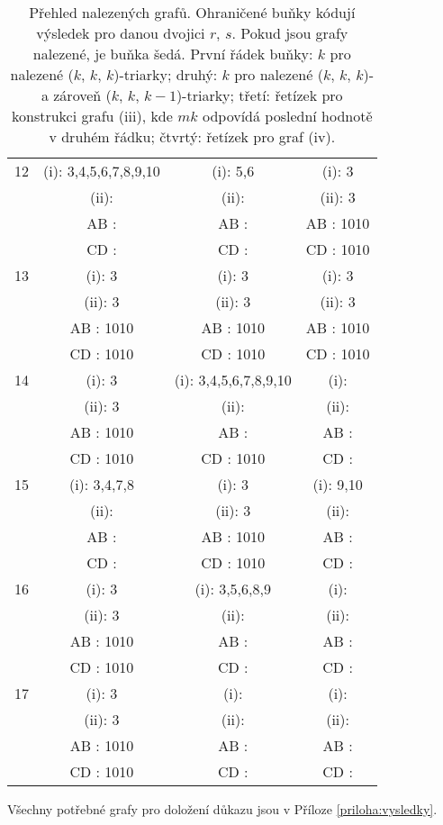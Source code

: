 \begin{table}[h]
{\begin{tabular}{| c || c | c | c |}
12 & (i): 3,4,5,6,7,8,9,10 & (i): 5,6 & \cellcolor{lightgray}(i): 3\\
 & (ii):  & (ii):  & \cellcolor{lightgray}(ii): 3\\
 & AB :  & AB :  & \cellcolor{lightgray}AB : 1010\\
 & CD :  & CD :  & \cellcolor{lightgray}CD : 1010\\\hline

13 & \cellcolor{lightgray}(i): 3 & \cellcolor{lightgray}(i): 3 & \cellcolor{lightgray}(i): 3\\
 & \cellcolor{lightgray}(ii): 3 & \cellcolor{lightgray}(ii): 3 & \cellcolor{lightgray}(ii): 3\\
 & \cellcolor{lightgray}AB : 1010 & \cellcolor{lightgray}AB : 1010 & \cellcolor{lightgray}AB : 1010\\
 & \cellcolor{lightgray}CD : 1010 & \cellcolor{lightgray}CD : 1010 & \cellcolor{lightgray}CD : 1010\\\hline

14 & \cellcolor{lightgray}(i): 3 & (i): 3,4,5,6,7,8,9,10 & (i): \\
 & \cellcolor{lightgray}(ii): 3 & (ii):  & (ii): \\
 & \cellcolor{lightgray}AB : 1010 & AB :  & AB : \\
 & \cellcolor{lightgray}CD : 1010 & CD : 1010 & CD : \\\hline

15 & (i): 3,4,7,8 & \cellcolor{lightgray}(i): 3 & (i): 9,10\\
 & (ii):  & \cellcolor{lightgray}(ii): 3 & (ii): \\
 & AB :  & \cellcolor{lightgray}AB : 1010 & AB : \\
 & CD :  & \cellcolor{lightgray}CD : 1010 & CD : \\\hline

16 & \cellcolor{lightgray}(i): 3 & (i): 3,5,6,8,9 & (i): \\
 & \cellcolor{lightgray}(ii): 3 & (ii):  & (ii): \\
 & \cellcolor{lightgray}AB : 1010 & AB :  & AB : \\
 & \cellcolor{lightgray}CD : 1010 & CD :  & CD : \\\hline

17 & \cellcolor{lightgray}(i): 3 & (i):  & (i): \\
 & \cellcolor{lightgray}(ii): 3 & (ii):  & (ii): \\
 & \cellcolor{lightgray}AB : 1010 & AB :  & AB : \\
 & \cellcolor{lightgray}CD : 1010 & CD :  & CD : \\\hline

\end{tabular}}
\caption{Přehled nalezených grafů. Ohraničené buňky kódují výsledek pro danou dvojici $r$, $s$. Pokud jsou grafy nalezené, je buňka šedá. První řádek buňky: $k$ pro nalezené ($k$, $k$, $k$)-triarky; druhý: $k$ pro nalezené ($k$, $k$, $k$)- a zároveň ($k$, $k$, $k-1$)-triarky; třetí: řetízek pro konstrukci grafu (iii), kde $mk$ odpovídá poslední hodnotě v druhém řádku; čtvrtý: řetízek pro graf (iv).}
\label{obr03:tabvysledkycele}
\end{table}

Všechny potřebné grafy pro doložení důkazu jsou v Příloze \ref{priloha:vysledky}.